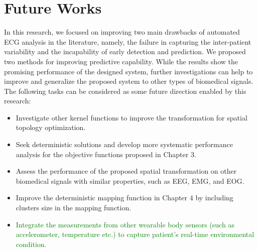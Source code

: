 \section{Future Works}
In this research, we focused on improving two main drawbacks of automated ECG analysis in the literature, namely, the failure in capturing the inter-patient variability and the incapability of early detection and prediction. We proposed two methods for improving predictive capability. While the results show the promising performance of the designed system, further investigations can help to improve and generalize the proposed system to other types of biomedical signals. The following tasks can be considered as some future direction enabled by this research:
 \begin{itemize}
\item Investigate other kernel functions to improve the transformation for spatial topology optimization.
\item Seek deterministic solutions and develop more systematic performance analysis for the objective functions proposed in Chapter 3.
\item Assess the performance of the proposed spatial transformation on other biomedical signals with similar properties, such as EEG, EMG, and EOG.
\item  Improve the deterministic mapping function in Chapter 4 by including clusters size in the mapping function.
\item \textcolor{green}{Integrate the measurements from other wearable body sensors (such as accelerometer, temperature etc.) to capture patient’s real-time environmental condition.
}
\end{itemize}

